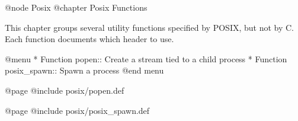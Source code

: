 @node Posix
@chapter Posix Functions

This chapter groups several utility functions specified by POSIX, but
not by C.  Each function documents which header to use.

@menu
* Function popen::       Create a stream tied to a child process
* Function posix_spawn:: Spawn a process
@end menu

@page
@include posix/popen.def

@page
@include posix/posix_spawn.def
